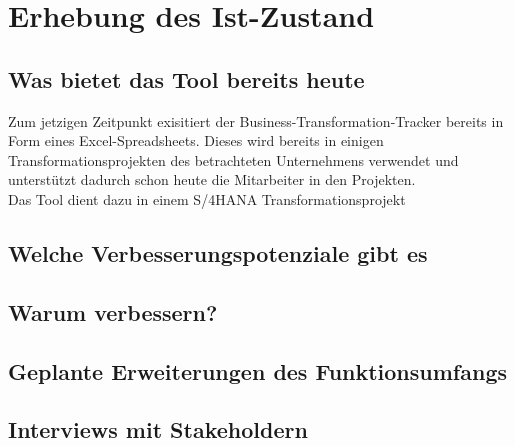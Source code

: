 \section{Erhebung des Ist-Zustand}

\subsection{Was bietet das Tool bereits heute}
Zum jetzigen Zeitpunkt exisitiert der Business-Transformation-Tracker bereits in Form eines Excel-Spreadsheets. Dieses wird bereits in einigen Transformationsprojekten des betrachteten Unternehmens verwendet und unterstützt dadurch schon heute die Mitarbeiter in den Projekten. \\Das Tool dient dazu in einem S/4HANA Transformationsprojekt 
\subsection{Welche Verbesserungspotenziale gibt es}

\subsection{Warum verbessern?}

\subsection{Geplante Erweiterungen des Funktionsumfangs}

\subsection{Interviews mit Stakeholdern}
